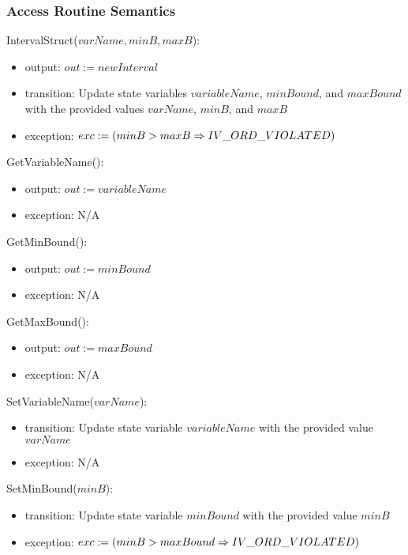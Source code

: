 \documentclass[12pt, titlepage]{article}
\begin{document}
\subsubsection{Access Routine Semantics}

\noindent IntervalStruct($varName, minB, maxB$):
\begin{itemize}
	\item output: $out := newInterval$
	\item transition: Update state variables $variableName$, $minBound$, and 
	$maxBound$ with the provided values $varName$, $minB$, and $maxB$
	\item exception: $exc := \\
	(minB > maxB \Rightarrow IV\_ORD\_VIOLATED)$
\end{itemize}

\noindent GetVariableName():
\begin{itemize}
	\item output: $out := variableName$
	\item exception: N/A
\end{itemize}

\noindent GetMinBound():
\begin{itemize}
	\item output: $out := minBound$
	\item exception: N/A
\end{itemize}

\noindent GetMaxBound():
\begin{itemize}
	\item output: $out := maxBound$
	\item exception: N/A
\end{itemize}

\noindent SetVariableName($varName$):
\begin{itemize}
	\item transition: Update state variable $variableName$ with the provided 
	value $varName$
	\item exception: N/A
\end{itemize}

\noindent SetMinBound($minB$):
\begin{itemize}
	\item transition: Update state variable $minBound$ with the provided value 
	$minB$
	\item exception: $exc := \\
	(minB > maxBound \Rightarrow IV\_ORD\_VIOLATED)$
\end{itemize}
\end{document}
